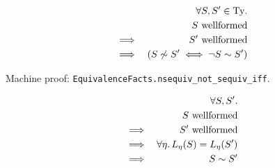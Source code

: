 \documentclass{llncs}
\newcommand*{\Ty}{\mathrm{Ty}}
\newcommand*{\sequiv}{\sim}
\newcommand*{\nsequiv}{\not\sim}
\newcommand*{\wf}[1]{\text{$#1$ {\normalfont \rmfamily wellformed}}}
\renewcommand*{\|}{\;|\;}
\newcommand*{\machproofc}[1]{Machine proof: \code{#1}.}
\newcommand*{\code}[1]{\texttt{#1}}
\begin{document}
\begin{lemma}
  \label{lemma:nsequiv_correct}
  \begin{eqnarray*}
    &&         \forall S, S' \in \Ty. \\
    &&         \wf{S} \\
    &\implies& \wf{S'} \\
    &\implies& (S \nsequiv S' \iff \lnot S \sequiv S')
  \end{eqnarray*}

  \machproofc{EquivalenceFacts.nsequiv\_not\_sequiv\_iff}
\end{lemma}


\begin{theorem}
  \label{th:equality_equivalence2}
  \begin{eqnarray*}
    &&         \forall S, S'. \\
    &&         \wf{S} \\
    &\implies& \wf{S'} \\
    &\implies& \forall \eta.\, L_\eta(S) = L_\eta(S') \\
    &\implies& S \sequiv S'
  \end{eqnarray*}
\end{theorem}
\end{document}
